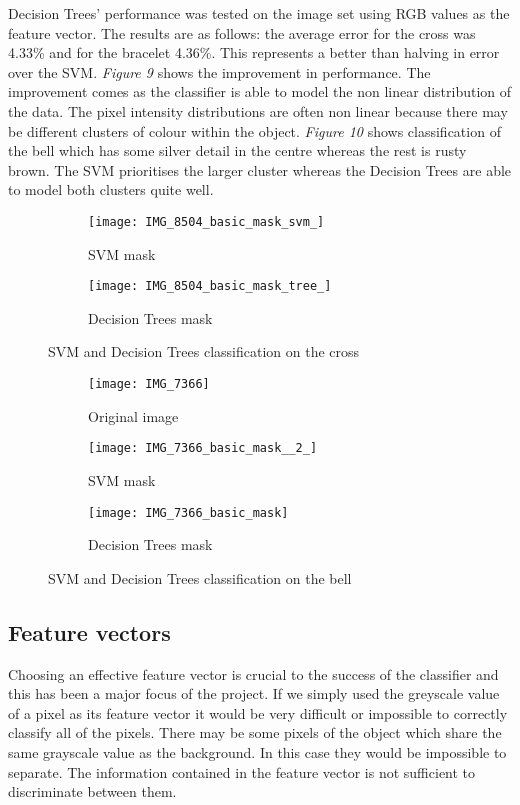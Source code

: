 \documentclass[12pt]{IIBproject}
\begin{document}
 Decision Trees' performance was tested on the image set using RGB values as the feature vector. The results are as follows: the average error for the cross was 4.33\% and for the bracelet 4.36\%. This represents a better than halving in error over the SVM. \emph{Figure 9} shows the improvement in performance. The improvement comes as the classifier is able to model the non linear distribution of the data. The pixel intensity distributions are often non linear because there may be different clusters of colour within the object. \emph{Figure 10} shows classification of the bell which has some silver detail in the centre whereas the rest is rusty brown. The SVM prioritises the larger cluster whereas the Decision Trees are able to model both clusters quite well.
\begin{figure}[H]
\centering
\begin{subfigure}{.5\textwidth}
  \centering
  \texttt{[image: IMG\_8504\_basic\_mask\_svm\_]}
  \caption{SVM mask}
  \label{fig:sub1}
\end{subfigure}%
\begin{subfigure}{.5\textwidth}
  \centering
  \texttt{[image: IMG\_8504\_basic\_mask\_tree\_]}
  \caption{Decision Trees mask}
  \label{fig:sub2}
\end{subfigure}
\caption{SVM and Decision Trees classification on the cross}
\label{fig:test}
\end{figure}
\begin{figure}[H]
\centering
\begin{subfigure}{.33\textwidth}
  \centering
  \texttt{[image: IMG\_7366]}
  \caption{Original image}
  \label{fig:sub1}
\end{subfigure}%
\begin{subfigure}{.33\textwidth}
  \centering
  \texttt{[image: IMG\_7366\_basic\_mask\_\_2\_]}
  \caption{SVM mask}
  \label{fig:sub2}
\end{subfigure}
\begin{subfigure}{.33\textwidth}
  \centering 
  \texttt{[image: IMG\_7366\_basic\_mask]}
  \caption{Decision Trees mask}
  \label{fig:sub2}
\end{subfigure}
\caption{SVM and Decision Trees classification on the bell}
\label{fig:test}
\end{figure}


\subsection{Feature vectors}
Choosing an effective feature vector is crucial to the success of the classifier and this has been a major focus of the project. If we simply used the greyscale value of a pixel as its feature vector it would be very difficult or impossible to correctly classify all of the pixels. There may be some pixels of the object which share the same grayscale value as the background. In this case they would be impossible to separate. The information contained in the feature vector is not sufficient to discriminate between them. 
\end{document}

